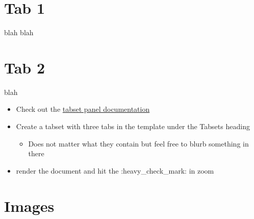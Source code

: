 \documentclass[
  letterpaper,
  DIV=11,
  numbers=noendperiod]{scrartcl}
\providecommand{\tightlist}{%
  \setlength{\itemsep}{0pt}\setlength{\parskip}{0pt}}\usepackage{longtable,booktabs,array}
\begin{document}
\section{Tab 1}

blah blah

\section{Tab 2}

blah

\begin{tcolorbox}[enhanced jigsaw, colback=white, arc=.35mm, colframe=quarto-callout-tip-color-frame, bottomrule=.15mm, coltitle=black, rightrule=.15mm, breakable, colbacktitle=quarto-callout-tip-color!10!white, title=\textcolor{quarto-callout-tip-color}{\faLightbulb}\hspace{0.5em}{Tabset exercise}, opacitybacktitle=0.6, bottomtitle=1mm, toptitle=1mm, leftrule=.75mm, left=2mm, opacityback=0, toprule=.15mm, titlerule=0mm]

\begin{itemize}
\item
  Check out the
  \href{https://quarto.org/docs/interactive/layout.html\#tabset-panel}{tabset
  panel documentation}
\item
  Create a tabset with three tabs in the template under the Tabsets
  heading

  \begin{itemize}
  \tightlist
  \item
    Does not matter what they contain but feel free to blurb something
    in there
  \end{itemize}
\item
  render the document and hit the :heavy\_check\_mark: in zoom
\end{itemize}

\end{tcolorbox}

\hypertarget{images}{%
\section{Images}\label{images}}
\end{document}
